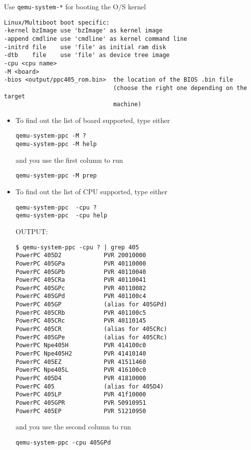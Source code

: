 Use \verb!qemu-system-*! for booting the O/S kernel
\begin{verbatim}
Linux/Multiboot boot specific:
-kernel bzImage use 'bzImage' as kernel image
-append cmdline use 'cmdline' as kernel command line
-initrd file    use 'file' as initial ram disk
-dtb    file    use 'file' as device tree image
-cpu <cpu name>
-M <board>       
-bios <output/ppc405_rom.bin>  the location of the BIOS .bin file
                               (choose the right one depending on the target
                               machine)
\end{verbatim}
\begin{itemize}
  \item To find out the list of board supported, type
  either 
\begin{verbatim}
qemu-system-ppc -M ?
qemu-system-ppc -M help
\end{verbatim}

and you use the first column to run
\begin{verbatim}
qemu-system-ppc -M prep
\end{verbatim}

  \item To find out the list of CPU supported, type either 
\begin{verbatim}
qemu-system-ppc  -cpu ?
qemu-system-ppc  -cpu help
\end{verbatim}

 OUTPUT:
\begin{verbatim}
$ qemu-system-ppc -cpu ? | grep 405
PowerPC 405D2            PVR 20010000
PowerPC 405GPa           PVR 40110000
PowerPC 405GPb           PVR 40110040
PowerPC 405CRa           PVR 40110041
PowerPC 405GPc           PVR 40110082
PowerPC 405GPd           PVR 401100c4
PowerPC 405GP            (alias for 405GPd)
PowerPC 405CRb           PVR 401100c5
PowerPC 405CRc           PVR 40110145
PowerPC 405CR            (alias for 405CRc)
PowerPC 405GPe           (alias for 405CRc)
PowerPC Npe405H          PVR 414100c0
PowerPC Npe405H2         PVR 41410140
PowerPC 405EZ            PVR 41511460
PowerPC Npe405L          PVR 416100c0
PowerPC 405D4            PVR 41810000
PowerPC 405              (alias for 405D4)
PowerPC 405LP            PVR 41f10000
PowerPC 405GPR           PVR 50910951
PowerPC 405EP            PVR 51210950
\end{verbatim}  
and you use the second column to run
\begin{verbatim}
qemu-system-ppc -cpu 405GPd
\end{verbatim}
\end{itemize}



